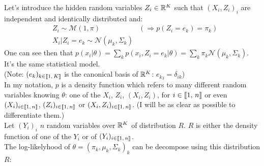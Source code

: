 \documentclass{article}
\begin{document}
Let's introduce the hidden random variables $Z_i \in \mathbb{R}^K$ such that $(X_i, Z_i)_i$ are independent and identically distributed and:
\begin{equation*}
    \begin{aligned}
         & Z_i \sim \mathcal{M}(1, \pi)                      & (\Rightarrow p(Z_i = e_k) = \pi_k) \\
         & X_i | Z_i = e_k \sim \mathcal{N}(\mu_k, \Sigma_k) &
    \end{aligned}
\end{equation*}
One can see then that $p(x_i |\theta) = \sum_k p(x_i, Z_i=e_k |\theta) = \sum_k \pi_k \mathcal{N}(\mu_k, \Sigma_k)$. It's the same statistical model.\\
(Note: $(e_k)_{k \in \left\llbracket1,\, K\right\rrbracket}$ is the canonical basis of $\mathbb{R}^K$: ${e_k}_i = \delta_{ik}$)
\vspace{10px}\\
In my notation, $p$ is a density function which refers to many different random variables knowing $\theta$: one of the $X_i$, $Z_i$, $(X_i, Z_i)$,
for $i \in \left\llbracket1,\, n\right\rrbracket$ or even $(X_i)_{i \in \left\llbracket1,\, n\right\rrbracket}$, $(Z_i)_{i \in \left\llbracket1,\, n\right\rrbracket}$ or $(X_i, Z_i)_{i \in \left\llbracket1,\, n\right\rrbracket}$. (I will be as clear
as possible to differentiate them.)
\vspace{10px}\\
Let $(Y_i)_i$ $n$ random variables over $\mathbb{R}^K$ of distribution $R$.
$R$ is either the density function of one of the $Y_i$ or of $(Y_i)_{i \in \left\llbracket1,\, n\right\rrbracket}$.\\
The log-likelyhood of $\theta = {(\pi_k, \mu_k, \Sigma_k)}_k$ can be decompose using this distribution $R$:
\end{document}

